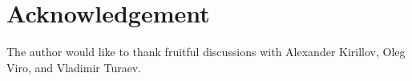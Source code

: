 \section*{Acknowledgement}

The author would like to thank fruitful discussions with
Alexander Kirillov, Oleg Viro, and Vladimir Turaev.
